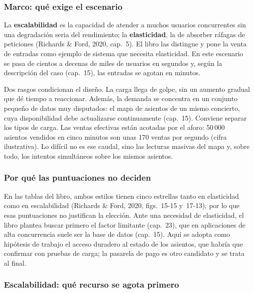 
\subsubsection{Marco: qué exige el escenario}

La \textbf{escalabilidad} es la capacidad de atender a muchos usuarios concurrentes
sin una degradación seria del rendimiento; la \textbf{elasticidad}, la de absorber
ráfagas de peticiones (Richards \& Ford, 2020, cap.~5). El libro las distingue y pone
la venta de entradas como ejemplo de sistema que necesita elasticidad. En este
escenario se pasa de cientos a decenas de miles de usuarios en segundos y, según la
descripción del caso (cap.~15), las entradas se agotan en minutos.

Dos rasgos condicionan el diseño. La carga llega de golpe, sin un aumento gradual
que dé tiempo a reaccionar. Además, la demanda se concentra en un conjunto pequeño de
datos muy disputados: el mapa de asientos de un mismo concierto, cuya disponibilidad
debe actualizarse continuamente (cap.~15). Conviene separar los tipos de carga. Las
ventas efectivas están acotadas por el aforo: 50\,000 asientos vendidos en cinco
minutos son unas 170 ventas por segundo (cifra ilustrativa). Lo difícil no es ese
caudal, sino las lecturas masivas del mapa y, sobre todo, los intentos simultáneos
sobre los mismos asientos.

\subsubsection{Por qué las puntuaciones no deciden}

En las tablas del libro, ambos estilos tienen cinco estrellas tanto en elasticidad
como en escalabilidad (Richards \& Ford, 2020, figs.~15-15 y~17-13), por lo que esas
puntuaciones no justifican la elección. Ante una necesidad de elasticidad, el libro
plantea buscar primero el factor limitante (cap.~23), que en aplicaciones de alta
concurrencia suele ser la base de datos (cap.~15). Aquí se adopta como hipótesis de
trabajo el acceso duradero al estado de los asientos, que habría que confirmar con
pruebas de carga; la pasarela de pago es otro candidato y se trata al final.

\subsubsection{Escalabilidad: qué recurso se agota primero}

